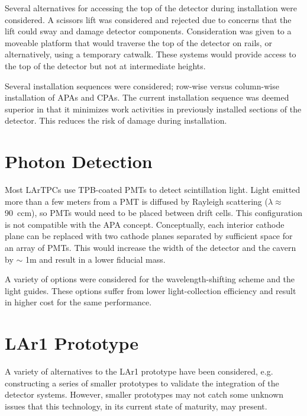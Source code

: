 Several alternatives for accessing the top of the detector during installation were considered. A scissors lift was considered and rejected due to concerns that the lift could sway and damage detector components. Consideration was given to a moveable platform that would traverse the top of the detector on rails, or alternatively, using a temporary catwalk. These systems would provide access to the top of the detector but not at intermediate heights.

Several installation sequences were considered; row-wise versus column-wise installation of APAs and CPAs. The current installation sequence was deemed superior in that it minimizes work activities in previously installed sections of the detector. This reduces the risk of damage during installation.

\section{Photon Detection}

Most LArTPCs use TPB-coated PMTs to detect scintillation light. Light emitted more than a few meters from a PMT is diffused by Rayleigh scattering ($\lambda \approx$ 90~ccm), so PMTs would need to be placed between drift cells. This configuration is not compatible with the APA concept. Conceptually, each interior cathode plane can be replaced with two cathode planes separated by sufficient space for an array of PMTs. This would increase the width of the detector and the cavern by $\sim$ 1m and result in a lower fiducial mass.

A variety of options were considered for the wavelength-shifting scheme and the light guides. These options suffer from lower light-collection efficiency and result in higher cost for the same performance.

\section{LAr1 Prototype}

A variety of alternatives to the LAr1 prototype have been considered, e.g. constructing a series of smaller prototypes to validate the integration of the detector systems. 
However, smaller prototypes may not catch some unknown issues that this technology, in its current state of maturity, may present.
